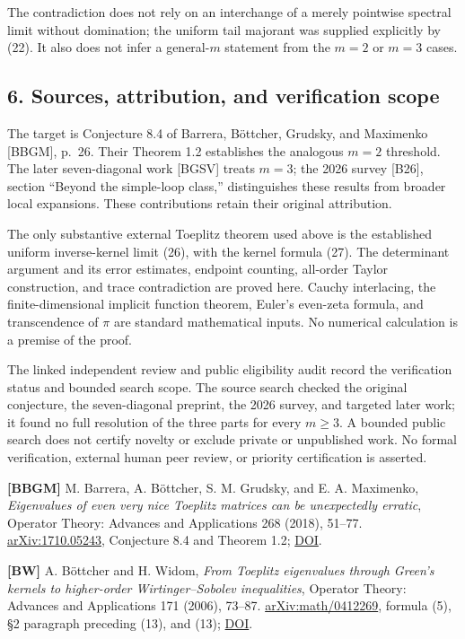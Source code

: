 \documentclass[10pt,a4paper]{article}
\begin{document}
The contradiction does not rely on an interchange of a merely pointwise spectral limit without domination; the uniform tail majorant was supplied explicitly by (22). It also does not infer a general-\(m\) statement from the \(m=2\) or \(m=3\) cases.

\subsection{6. Sources, attribution, and verification scope}\label{sources-attribution-and-verification-scope}

The target is Conjecture 8.4 of Barrera, Böttcher, Grudsky, and Maximenko {[}BBGM{]}, p.~26. Their Theorem 1.2 establishes the analogous \(m=2\) threshold. The later seven-diagonal work {[}BGSV{]} treats \(m=3\); the 2026 survey {[}B26{]}, section ``Beyond the simple-loop class,'' distinguishes these results from broader local expansions. These contributions retain their original attribution.

The only substantive external Toeplitz theorem used above is the established uniform inverse-kernel limit (26), with the kernel formula (27). The determinant argument and its error estimates, endpoint counting, all-order Taylor construction, and trace contradiction are proved here. Cauchy interlacing, the finite-dimensional implicit function theorem, Euler's even-zeta formula, and transcendence of \(\pi\) are standard mathematical inputs. No numerical calculation is a premise of the proof.

The linked independent review and public eligibility audit record the verification status and bounded search scope. The source search checked the original conjecture, the seven-diagonal preprint, the 2026 survey, and targeted later work; it found no full resolution of the three parts for every \(m\ge3\). A bounded public search does not certify novelty or exclude private or unpublished work. No formal verification, external human peer review, or priority certification is asserted.

\textbf{{[}BBGM{]}} M. Barrera, A. Böttcher, S. M. Grudsky, and E. A. Maximenko, \emph{Eigenvalues of even very nice Toeplitz matrices can be unexpectedly erratic}, Operator Theory: Advances and Applications 268 (2018), 51--77. \href{https://arxiv.org/abs/1710.05243}{arXiv:1710.05243}, Conjecture 8.4 and Theorem 1.2; \href{https://doi.org/10.1007/978-3-319-75996-8_2}{DOI}.

\textbf{{[}BW{]}} A. Böttcher and H. Widom, \emph{From Toeplitz eigenvalues through Green's kernels to higher-order Wirtinger--Sobolev inequalities}, Operator Theory: Advances and Applications 171 (2006), 73--87. \href{https://arxiv.org/abs/math/0412269}{arXiv:math/0412269}, formula (5), §2 paragraph preceding (13), and (13); \href{https://doi.org/10.1007/978-3-7643-7980-3_4}{DOI}.
\end{document}
